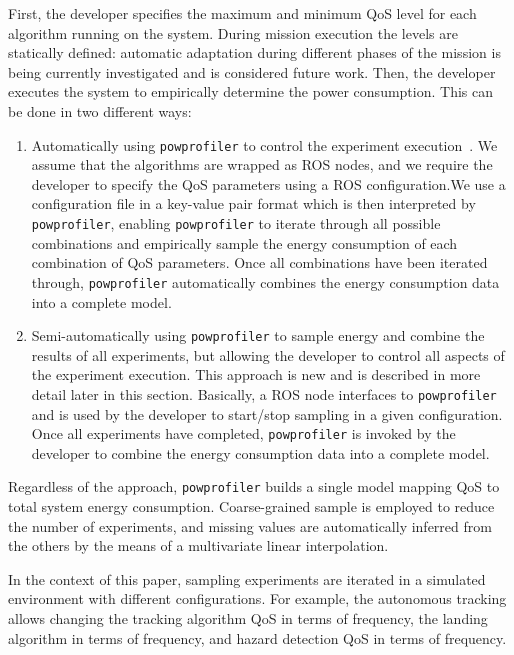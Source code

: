 \documentclass[conference]{IEEEtran}
\newcommand{\stt}[1]{{\small\tt #1}} %
\newcommand{\powprof}{\stt{powprofiler}}
\begin{document}
First, the developer specifies the maximum and minimum QoS level for
each algorithm running on the system.  During mission execution the
levels are statically defined: automatic adaptation during different
phases of the mission is being currently investigated and is
considered future work.
%
Then, the developer executes the system to empirically determine the
power consumption. This can be done in two different ways:
%
\begin{enumerate}
\item Automatically using \powprof{} to control the experiment
  execution~\cite{seewald2019coarse}.  We assume that the algorithms
  are wrapped as ROS nodes, and we require the developer to specify
  the QoS parameters using a ROS configuration.We use a configuration
  file in a key-value pair format which is then interpreted by
  \powprof{}, enabling \powprof{} to iterate through all possible
  combinations and empirically sample the energy consumption of each
  combination of QoS parameters. Once all combinations have been
  iterated through, \powprof{} automatically combines the energy
  consumption data into a complete model.
\item Semi-automatically using \powprof{} to sample energy and combine
  the results of all experiments, but allowing the developer to
  control all aspects of the experiment execution. This approach is
  new and is described in more detail later in this
  section. Basically, a ROS node interfaces to \powprof{} and is used
  by the developer to start/stop sampling in a given
  configuration. Once all experiments have completed, \powprof{} is
  invoked by the developer to combine the energy consumption data into
  a complete model.
\end{enumerate}
%
Regardless of the approach, \powprof{} builds a single model mapping
QoS to total system energy consumption. Coarse-grained sample is
employed to reduce the number of experiments, and missing values are
automatically inferred from the others by the means of a multivariate
linear interpolation.

In the context of this paper, sampling experiments are iterated in a
simulated environment with different configurations.  For example, the
autonomous tracking allows changing the tracking algorithm QoS in
terms of frequency, the landing algorithm in terms of frequency, and
hazard detection QoS in terms of frequency.
%
\end{document}

